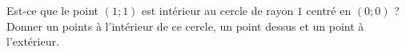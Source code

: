 
\begin{exercice}\label{exoSeconde-0009}

    Est-ce que le point \( (1;1)\) est intérieur au cercle de rayon \( 1\) centré en \( (0;0)\) ? Donner un points à l'intérieur de ce cercle, un point dessus et un point à l'extérieur.

\end{exercice}
